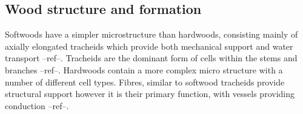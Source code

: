 \subsection{Wood structure and formation}
Softwoods have a simpler microstructure than hardwoods, consisting mainly of
axially elongated tracheids which provide both mechanical support and water
transport --ref--. Tracheids are the dominant form of cells within the stems and
branches --ref--. Hardwoods contain a more complex micro structure with a number
of different cell types. Fibres, similar to softwood tracheids provide
structural support however it is their primary function, with vessels providing
conduction --ref--.